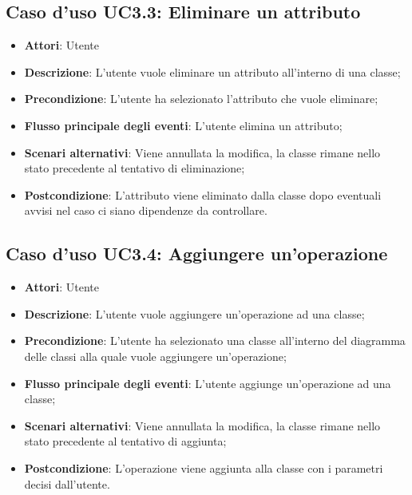 \documentclass[../AnalisiDeiRequisiti.tex]{subfiles}
\begin{document}
		\subsection{Caso d'uso UC3.3: Eliminare un attributo}
		\begin{itemize}
			\item \textbf{Attori}: Utente
			\item \textbf{Descrizione}: L'utente vuole eliminare un attributo all'interno di una classe;
			\item \textbf{Precondizione}: L'utente ha selezionato l'attributo che vuole eliminare;
			\item \textbf{Flusso principale degli eventi}: L'utente elimina un attributo;
			\item \textbf{Scenari alternativi}: Viene annullata la modifica, la classe rimane nello stato precedente al tentativo di eliminazione;
			\item \textbf{Postcondizione}: L'attributo viene eliminato dalla classe dopo eventuali avvisi nel caso ci siano dipendenze da controllare.
		\end{itemize}
		\subsection{Caso d'uso UC3.4: Aggiungere un'operazione}
		\begin{itemize}
			\item \textbf{Attori}: Utente
			\item \textbf{Descrizione}: L'utente vuole aggiungere un'operazione ad una classe;
			\item \textbf{Precondizione}: L'utente ha selezionato una classe all'interno del diagramma delle classi alla quale vuole aggiungere un'operazione;
			\item \textbf{Flusso principale degli eventi}: L'utente aggiunge un'operazione ad una classe;
			\item \textbf{Scenari alternativi}: Viene annullata la modifica, la classe rimane nello stato precedente al tentativo di aggiunta;
			\item \textbf{Postcondizione}: L'operazione viene aggiunta alla classe con i parametri decisi dall'utente.
		\end{itemize}
\end{document}
